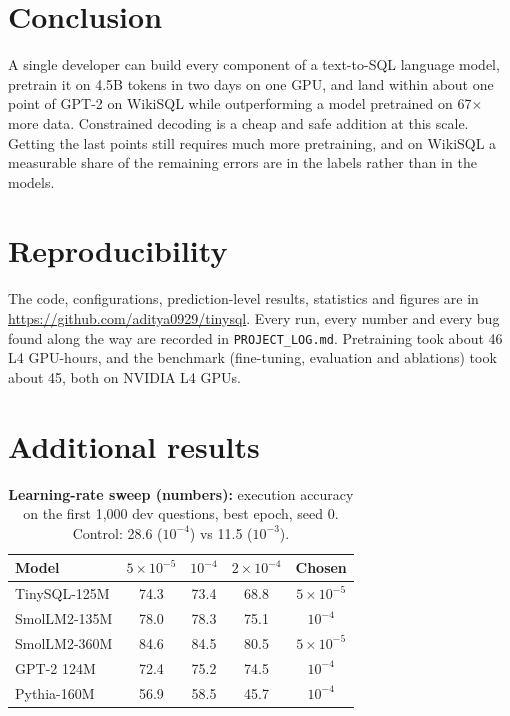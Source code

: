 \documentclass[11pt]{article}
\begin{document}
\section{Conclusion}

A single developer can build every component of a text-to-SQL language model, pretrain it on 4.5B tokens in two days on one GPU, and land within about one point of GPT-2 on WikiSQL while outperforming a model pretrained on 67$\times$ more data. Constrained decoding is a cheap and safe addition at this scale. Getting the last points still requires much more pretraining, and on WikiSQL a measurable share of the remaining errors are in the labels rather than in the models.

\section*{Reproducibility}

The code, configurations, prediction-level results, statistics and figures are in \url{https://github.com/aditya0929/tinysql}. Every run, every number and every bug found along the way are recorded in \texttt{PROJECT\_LOG.md}. Pretraining took about 46 L4 GPU-hours, and the benchmark (fine-tuning, evaluation and ablations) took about 45, both on NVIDIA L4 GPUs.




\appendix
\section{Additional results}

\begin{table}[h]
\centering
\small
\begin{tabular}{lcccc}
\toprule
Model & $5\times10^{-5}$ & $10^{-4}$ & $2\times10^{-4}$ & Chosen \\
\midrule
TinySQL-125M & 74.3 & 73.4 & 68.8 & $5\times10^{-5}$ \\
SmolLM2-135M & 78.0 & 78.3 & 75.1 & $10^{-4}$ \\
SmolLM2-360M & 84.6 & 84.5 & 80.5 & $5\times10^{-5}$ \\
GPT-2 124M & 72.4 & 75.2 & 74.5 & $10^{-4}$ \\
Pythia-160M & 56.9 & 58.5 & 45.7 & $10^{-4}$ \\
\bottomrule
\end{tabular}
\caption{\textbf{Learning-rate sweep (numbers):} execution accuracy on the first 1,000 dev questions, best epoch, seed 0. Control: 28.6 ($10^{-4}$) vs 11.5 ($10^{-3}$).}
\label{tab:lr}
\end{table}
\end{document}
